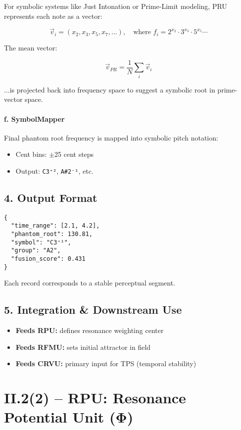 For symbolic systems like Just Intonation or Prime-Limit modeling, PRU represents each note as a vector:

\[
\vec{v}_i = (x_2, x_3, x_5, x_7, \ldots), \quad \text{where } f_i = 2^{x_2} \cdot 3^{x_3} \cdot 5^{x_5} \cdots
\]

The mean vector:

\[
\vec{v}_{PR} = \frac{1}{N} \sum_i \vec{v}_i
\]

...is projected back into frequency space to suggest a symbolic root in prime-vector space.

\paragraph{f. SymbolMapper}

Final phantom root frequency is mapped into symbolic pitch notation:

\begin{itemize}
    \item Cent bins: $\pm$25 cent steps
    \item Output: \texttt{C3⁺²}, \texttt{A\#2⁻¹}, etc.
\end{itemize}

\subsection*{4. Output Format}

\begin{verbatim}
{
  "time_range": [2.1, 4.2],
  "phantom_root": 130.81,
  "symbol": "C3⁺¹",
  "group": "A2",
  "fusion_score": 0.431
}
\end{verbatim}

Each record corresponds to a stable perceptual segment.

\subsection*{5. Integration & Downstream Use}

\begin{itemize}
    \item \textbf{Feeds RPU:} defines resonance weighting center
    \item \textbf{Feeds RFMU:} sets initial attractor in field
    \item \textbf{Feeds CRVU:} primary input for TPS (temporal stability)
\end{itemize}

\section*{II.2(2) – RPU: Resonance Potential Unit (Φ)}


